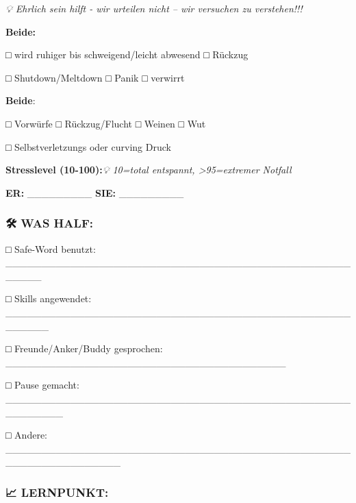 \emph{💡 Ehrlich sein hilft - wir urteilen nicht -- wir versuchen zu verstehen!!!}

\textbf{Beide:}

□ wird ruhiger bis schweigend/leicht abwesend □ Rückzug

□ Shutdown/Meltdown □ Panik □ verwirrt

\textbf{Beide}:

□ Vorwürfe □ Rückzug/Flucht □ Weinen □ Wut

□ Selbstverletzungs oder curving Druck

\textbf{Stresslevel (10-100):}\emph{💡 10=total entspannt, \textgreater95=extremer Notfall}

\textbf{ER:} \_\_\_\_\_\_\_\_\_ \textbf{SIE:} \_\_\_\_\_\_\_\_\_

\hypertarget{section-4}{%
\subsubsection{}\label{section-4}}

\hypertarget{was-half}{%
\subsubsection{\texorpdfstring{\textbf{🛠️ WAS HALF:}}{🛠️ WAS HALF:}}\label{was-half}}

□ Safe-Word benutzt: \_\_\_\_\_\_\_\_\_\_\_\_\_\_\_\_\_\_\_\_\_\_\_\_\_\_\_\_\_\_\_\_\_\_\_\_\_\_\_\_\_\_\_\_\_\_\_\_\_\_\_\_\_

□ Skills angewendet: \_\_\_\_\_\_\_\_\_\_\_\_\_\_\_\_\_\_\_\_\_\_\_\_\_\_\_\_\_\_\_\_\_\_\_\_\_\_\_\_\_\_\_\_\_\_\_\_\_\_\_\_\_\_

□ Freunde/Anker/Buddy gesprochen: \_\_\_\_\_\_\_\_\_\_\_\_\_\_\_\_\_\_\_\_\_\_\_\_\_\_\_\_\_\_\_\_\_\_\_\_\_\_\_

□ Pause gemacht: \_\_\_\_\_\_\_\_\_\_\_\_\_\_\_\_\_\_\_\_\_\_\_\_\_\_\_\_\_\_\_\_\_\_\_\_\_\_\_\_\_\_\_\_\_\_\_\_\_\_\_\_\_\_\_\_

□ Andere: \_\_\_\_\_\_\_\_\_\_\_\_\_\_\_\_\_\_\_\_\_\_\_\_\_\_\_\_\_\_\_\_\_\_\_\_\_\_\_\_\_\_\_\_\_\_\_\_\_\_\_\_\_\_\_\_\_\_\_\_\_\_\_\_

\hypertarget{section-5}{%
\subsubsection{}\label{section-5}}

\hypertarget{lernpunkt}{%
\subsubsection{\texorpdfstring{\textbf{📈 LERNPUNKT:}}{📈 LERNPUNKT:}}\label{lernpunkt}}


